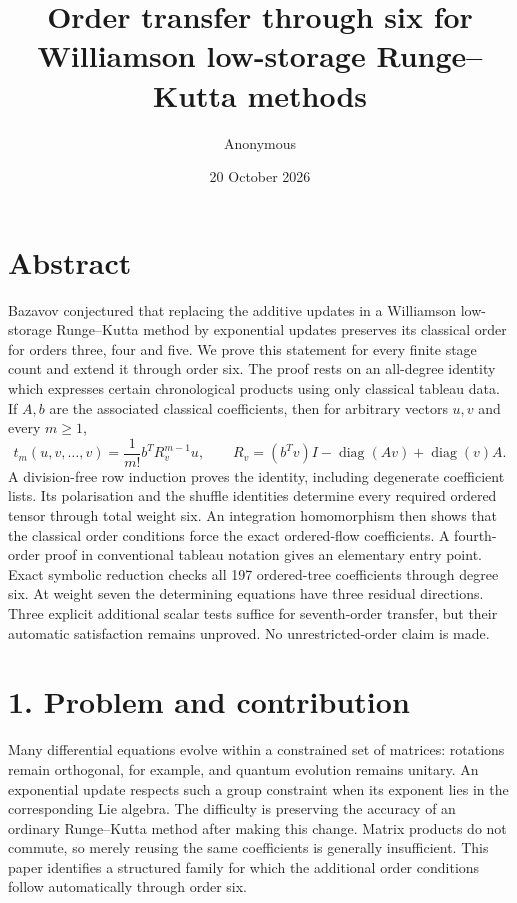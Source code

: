\documentclass[
  11pt,
  a4paper,
]{scrartcl}
\title{Order transfer through six for Williamson low-storage
Runge--Kutta methods}
\author{Anonymous}
\date{20 October 2026}
\begin{document}
\maketitle

\section{Abstract}\label{abstract}

Bazavov conjectured that replacing the additive updates in a Williamson
low-storage Runge--Kutta method by exponential updates preserves its
classical order for orders three, four and five. We prove this statement
for every finite stage count and extend it through order six. The proof
rests on an all-degree identity which expresses certain chronological
products using only classical tableau data. If \(A,b\) are the
associated classical coefficients, then for arbitrary vectors \(u,v\)
and every \(m\geq1\), \[
 t_m(u,v,\ldots,v)=\frac1{m!}b^TR_v^{m-1}u,\qquad
 R_v=(b^Tv)I-\operatorname{diag}(Av)+\operatorname{diag}(v)A.
\] A division-free row induction proves the identity, including
degenerate coefficient lists. Its polarisation and the shuffle
identities determine every required ordered tensor through total weight
six. An integration homomorphism then shows that the classical order
conditions force the exact ordered-flow coefficients. A fourth-order
proof in conventional tableau notation gives an elementary entry point.
Exact symbolic reduction checks all 197 ordered-tree coefficients
through degree six. At weight seven the determining equations have three
residual directions. Three explicit additional scalar tests suffice for
seventh-order transfer, but their automatic satisfaction remains
unproved. No unrestricted-order claim is made.

\section{1. Problem and contribution}\label{problem-and-contribution}

Many differential equations evolve within a constrained set of matrices:
rotations remain orthogonal, for example, and quantum evolution remains
unitary. An exponential update respects such a group constraint when its
exponent lies in the corresponding Lie algebra. The difficulty is
preserving the accuracy of an ordinary Runge--Kutta method after making
this change. Matrix products do not commute, so merely reusing the same
coefficients is generally insufficient. This paper identifies a
structured family for which the additional order conditions follow
automatically through order six.
\end{document}
